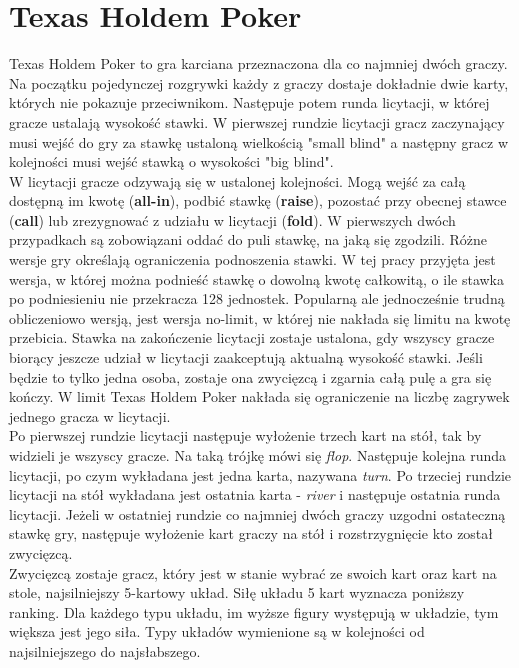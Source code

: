 \documentclass[licencjacka]{pracamgr}
\begin{document}
\section{Texas Holdem Poker}

Texas Holdem Poker to gra karciana przeznaczona dla co najmniej dwóch graczy. Na początku pojedynczej rozgrywki każdy z graczy
dostaje dokładnie dwie karty, których nie pokazuje przeciwnikom. Następuje potem runda licytacji, w której
gracze ustalają wysokość stawki. W pierwszej rundzie licytacji gracz zaczynający musi wejść do gry
za stawkę ustaloną wielkością "small blind" a następny gracz w kolejności musi wejść stawką o wysokości
"big blind". \\

\noindent
W licytacji gracze odzywają się w ustalonej kolejności. Mogą wejść za całą dostępną im kwotę (\textbf{all-in}),
podbić stawkę (\textbf{raise}), pozostać przy
obecnej stawce (\textbf{call}) lub zrezygnować z udziału w licytacji (\textbf{fold}). W pierwszych dwóch przypadkach są
zobowiązani oddać do puli stawkę, na jaką się zgodzili. Różne wersje gry określają ograniczenia podnoszenia
stawki. W tej pracy przyjęta jest wersja, w której można podnieść stawkę o dowolną kwotę całkowitą, o ile stawka
po podniesieniu nie przekracza 128 jednostek. Popularną ale jednocześnie trudną obliczeniowo wersją,
jest wersja no-limit, w której nie nakłada się limitu na kwotę przebicia.
Stawka na zakończenie licytacji zostaje ustalona, gdy
wszyscy gracze biorący jeszcze udział w licytacji zaakceptują aktualną wysokość stawki. Jeśli będzie to
tylko jedna osoba, zostaje ona zwycięzcą i zgarnia całą pulę a gra się kończy. W limit Texas Holdem Poker
nakłada się ograniczenie na liczbę zagrywek jednego gracza w licytacji.\\

\noindent
Po pierwszej rundzie licytacji następuje wyłożenie trzech kart na stół, tak by widzieli je wszyscy gracze.
Na taką trójkę mówi się \emph{flop}. Następuje kolejna runda licytacji, po czym wykładana jest jedna karta, nazywana \emph{turn}.
Po trzeciej rundzie licytacji na stół wykładana jest ostatnia karta - \emph{river} i następuje ostatnia runda
licytacji. Jeżeli w ostatniej rundzie co najmniej dwóch graczy uzgodni ostateczną stawkę gry, następuje
wyłożenie kart graczy na stół i rozstrzygnięcie kto został zwycięzcą. \\

\noindent
Zwycięzcą zostaje gracz, który jest w stanie wybrać ze swoich kart oraz kart na stole, najsilniejszy
5-kartowy układ. Siłę układu 5 kart wyznacza poniższy ranking. Dla każdego typu układu, im wyższe
figury występują w układzie, tym większa jest jego siła. Typy układów wymienione są w kolejności
od najsilniejszego do najsłabszego.
\end{document}
